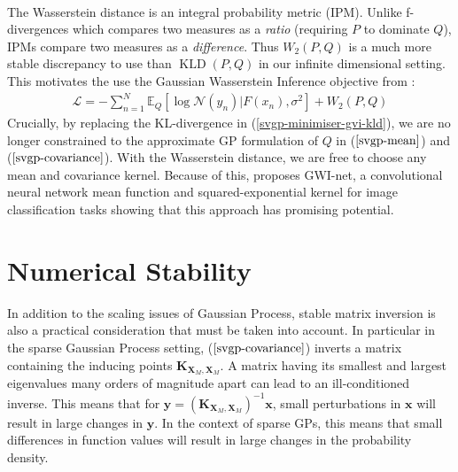 \documentclass[twoside,11pt]{article}
\newcommand{\KLD}{\operatorname{KLD}}
\begin{document}
\\The Wasserstein distance is an integral probability metric (IPM). Unlike f-divergences which compares two measures as a \textit{ratio} (requiring $P$ to dominate $Q$), IPMs compare two measures as a \textit{difference}. Thus $W_2(P, Q)$ is a much more stable discrepancy to use than $\KLD(P, Q)$ in our infinite dimensional setting. This motivates the use the Gaussian Wasserstein Inference objective from \cite{wild2022generalized}:
\begin{align}
    \label{gwi-objective}
    \mathcal{L} = -\sum_{n=1}^N \mathbb{E}_{Q}\left[\log \mathcal{N}(y_n) \vert F(x_n), \sigma^2\right] + W_2 (P, Q)
\end{align}
Crucially, by replacing the KL-divergence in (\ref{svgp-minimiser-gvi-kld}), we are no longer constrained to the approximate GP formulation of $Q$ in  ($\ref{svgp-mean}$) and ($\ref{svgp-covariance}$). With the Wasserstein distance, we are free to choose any mean and covariance kernel. Because of this, \cite{wild2022generalized} proposes GWI-net, a convolutional neural network mean function and squared-exponential kernel for image classification tasks showing that this approach has promising potential.

\section{Numerical Stability \cite{burt2020convergence}}
In addition to the scaling issues of Gaussian Process, stable matrix inversion is also a practical consideration that must be taken into account. In particular in the sparse Gaussian Process setting,  ($\ref{svgp-covariance}$)  inverts a matrix containing the inducing points  $\mathbf{K}_{\mathbf{X}_M, \mathbf{X}_M}$. A matrix having its smallest and largest eigenvalues many orders of magnitude apart can lead to an ill-conditioned inverse. This means that for $\mathbf{y} = \left(\mathbf{K}_{\mathbf{X}_M, \mathbf{X}_M}\right)^{-1}\mathbf{x}$, small perturbations in $\mathbf{x}$ will result in large changes in $\mathbf{y}$. In the context of sparse GPs, this means that small differences in function values will result in large changes in the probability density. 
\end{document}
